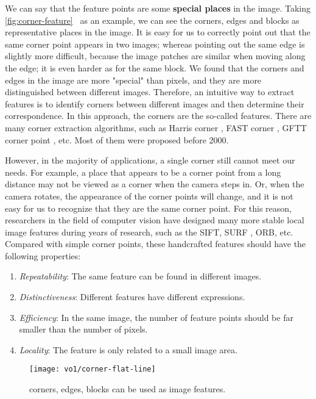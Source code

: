 We can say that the feature points are some \textbf{special places} in the image. Taking \autoref{fig:corner-feature}~ as an example, we can see the corners, edges and blocks as representative places in the image. It is easy for us to correctly point out that the same corner point appears in two images; whereas pointing out the same edge is slightly more difficult, because the image patches are similar when moving along the edge; it is even harder as for the same block. We found that the corners and edges in the image are more "special" than pixels, and they are more distinguished between different images. Therefore, an intuitive way to extract features is to identify corners between different images and then determine their correspondence. In this approach, the corners are the so-called features. There are many corner extraction algorithms, such as Harris corner \textsuperscript{\cite{Harris1988}}, FAST corner \textsuperscript{\cite{Rosten2006}}, GFTT corner point \textsuperscript{\cite{Shi1994}}, etc. Most of them were proposed before 2000.

However, in the majority of applications, a single corner still cannot meet our needs. For example, a place that appears to be a corner point from a long distance may not be viewed as a corner when the camera steps in. Or, when the camera rotates, the appearance of the corner points will change, and it is not easy for us to recognize that they are the same corner point. For this reason, researchers in the field of computer vision have designed many more stable local image features during years of research, such as the SIFT\textsuperscript{\cite{Lowe2004}}, SURF\textsuperscript{\cite{Bay2006}} , ORB\textsuperscript{\cite{Rublee2011}}, etc. Compared with simple corner points, these handcrafted features should have the following properties:

\begin{enumerate}
\item \emph{Repeatability}: The same feature can be found in different images.
\item \emph{Distinctiveness}: Different features have different expressions.
\item \emph{Efficiency}: In the same image, the number of feature points should be far smaller than the number of pixels.
\item \emph{Locality}: The feature is only related to a small image area.
\end{enumerate}

\begin{figure}[!ht]
    \centering
    \texttt{[image: vo1/corner-flat-line]}\\
    \caption{corners, edges, blocks can be used as image features.}
    \label{fig:corner-feature}
\end{figure}

